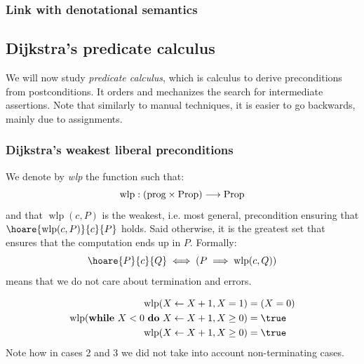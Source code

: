\documentclass[toc, titlepaged]{../cs-classes/cs-classes}
\DeclareMathOperator{\wlp}{wlp}
\begin{document}
\subsubsection{Link with denotational semantics}

\subsection{Dijkstra's predicate calculus}
We will now study \emph{predicate calculus}, which is calculus to derive preconditions from postconditions. It orders and mechanizes the search for intermediate assertions. Note that similarly to manual techniques, it is easier to go backwards, mainly due to assignments.

\subsubsection{Dijkstra's weakest liberal preconditions}
\begin{definition}
    We denote by \emph{wlp} the function such that:
    \begin{equation*}
        \wlp: (\textnormal{prog} \times \textnormal{Prop}) \longrightarrow \textnormal{Prop}
    \end{equation*}
    and that $\wlp(c, P)$ is the weakest, i.e. most general, precondition ensuring that $\hoare{\wlp(c, P)}{c}{P}$ holds. Said otherwise, it is the greatest set that ensures that the computation ends up in $P$. Formally:
    \begin{equation*}
        \hoare{P}{c}{Q} \iff (P\implies\wlp(c, Q))
    \end{equation*}
     means that we do not care about termination and errors.
\end{definition}

\begin{example}
    \begin{equation*}
        \begin{aligned}
            \wlp(X\leftarrow X+1, X=1) &= (X=0)\\
            \wlp(\textnormal{\textbf{while} $X<0$ \textbf{do} $X\leftarrow X+1$}, X\geq0) &= \true\\
            \wlp(X\leftarrow X+1, X\geq0) &= \true\\
        \end{aligned}
    \end{equation*}
    Note how in cases 2 and 3 we did not take into account non-terminating cases.
\end{example}
\end{document}
